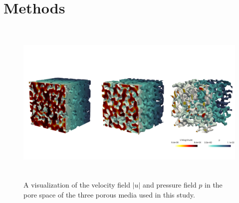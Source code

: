 \documentclass[draft]{agujournal2019}
\begin{document}
\section{Methods}
\begin{figure}[t!]
\includegraphics[height=8cm]{figures/PM_combined_surfaces_DNS.png}
\caption{A visualization of the velocity field $|u|$ and pressure field $p$ in the pore space of the three porous media used in this study.}
\label{fig:DNS}
\end{figure}
\end{document}
